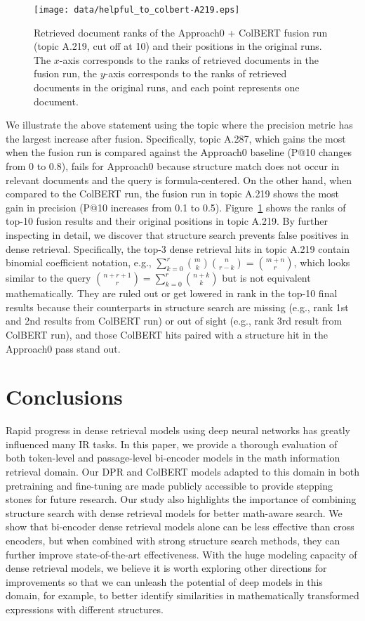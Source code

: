 \documentclass[11pt]{article}
\begin{document}
\begin{figure}
  \centering
  \vspace{-0.2in}
  \texttt{[image: data/helpful\_to\_colbert-A219.eps]}
  \caption{Retrieved document ranks of the Approach0 + ColBERT fusion run (topic A.219, cut off at 10) and their positions in the original runs. The $x$-axis corresponds to the ranks of retrieved documents in the fusion run, the $y$-axis corresponds to the ranks of retrieved documents in the original runs, and each point represents one document.}
  \label{fig:rankchange}
\end{figure}

We illustrate the above statement using the topic where the precision metric has the largest increase after fusion.
Specifically, topic A.287, which gains the most when the fusion run is compared against the Approach0 baseline (P@10 changes from 0 to 0.8), fails for Approach0 because structure match does not occur in relevant documents and the query is formula-centered. 
On the other hand, when compared to the ColBERT run, the fusion run in topic A.219 shows the most gain in precision (P@10 increases from 0.1 to 0.5).
Figure~\ref{fig:rankchange} shows the ranks of top-10 fusion results and their original positions in topic A.219.
By further inspecting in detail, we discover that structure search prevents false positives in dense retrieval.
Specifically, the top-3 dense retrieval hits in topic A.219 contain binomial coefficient notation, e.g., $\sum\limits_{k=0}^r \binom{m}{k}\binom{n}{r-k} = \binom{m+n}{r}$, which looks similar to the query $\binom{n+r+1}{r}=\sum_{k=0}^{r}\binom{n+k}{k}$ but is not equivalent mathematically.
They are ruled out or get lowered in rank in the top-10 final results because their counterparts in structure search are missing (e.g., rank 1st and 2nd results from ColBERT run) or out of sight (e.g., rank 3rd result from ColBERT run), and those ColBERT hits paired with a structure hit in the Approach0 pass stand out.


\section{Conclusions}

Rapid progress in dense retrieval models using deep neural networks has greatly influenced many IR tasks.
In this paper, we provide a thorough evaluation of both token-level and passage-level bi-encoder models in the math information retrieval domain.
Our DPR and ColBERT models adapted to this domain in both pretraining and fine-tuning are made publicly accessible to provide stepping stones for future research.
Our study also highlights the importance of combining structure search with dense retrieval models for better math-aware search.
We show that bi-encoder dense retrieval models alone can be less effective than cross encoders, but when combined with strong structure search methods, they can further improve state-of-the-art effectiveness.
With the huge modeling capacity of dense retrieval models, we believe it is worth exploring other directions for improvements so that we can unleash the potential of deep models in this domain, for example, to better identify similarities in mathematically transformed expressions with different structures.
\end{document}
